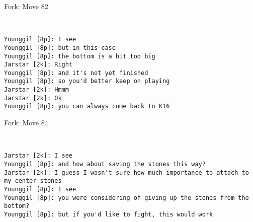 \documentclass{article}
\begin{document}
\begin{subsection}{Fork: Move 82}
\begin{center}
\cleargoban
{}
\showfullgoban
\\\begin{lstlisting}
Younggil [8p]: I see
Younggil [8p]: but in this case
Younggil [8p]: the bottom is a bit too big
Jarstar [2k]: Right
Younggil [8p]: and it's not yet finished
Younggil [8p]: so you'd better keep on playing
Jarstar [2k]: Hmmm
Jarstar [2k]: Ok
Younggil [8p]: you can always come back to K16
\end{lstlisting}
\end{center}
\end{subsection}
\begin{subsection}{Fork: Move 84}
\begin{center}
\cleargoban
{}
\showfullgoban
\\\begin{lstlisting}
Jarstar [2k]: I see
Younggil [8p]: and how about saving the stones this way?
Jarstar [2k]: I guess I wasn't sure how much importance to attach to my center stones
Younggil [8p]: I see
Younggil [8p]: you were considering of giving up the stones from the bottom?
Younggil [8p]: but if you'd like to fight, this would work
\end{lstlisting}
\end{center}
\end{subsection}
\newpage
\end{document}
